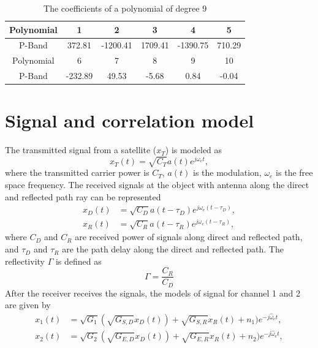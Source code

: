 \documentclass[draftcls]{IEEEtran}
\begin{document}
\begin{table}[ht]
\centering
\begin{tabular}  {|c|c|c|c|c|c|}
	\hline
     Polynomial &1&2 &3&4&5\\
    \hline
   P-Band & 372.81 & -1200.41 &	1709.41 & -1390.75 & 710.29\\
     \hline
     Polynomial &6&7&8&9 &10\\
    \hline
   P-Band & -232.89 &	49.53 &	-5.68 & 0.84 & -0.04 \\
    \hline
\end{tabular}
\caption{The coefficients of a polynomial of degree 9}
\label{Table:Polynomial_fitting}
\end{table}

\section{Signal and correlation model}
The transmitted signal from a satellite ($x_{T}$) is modeled as
\begin{equation}
	x_T(t)=\sqrt{C_T}a(t)e^{j\omega_et},
    \label{Eq: xT}
\end{equation}
where the transmitted carrier power is $C_{T}$, $a(t)$ is the modulation, $ω_{e}$ is the free space frequency. The received signals at the object with antenna along the direct and reflected path ray can be represented \begin{equation}
	\begin{split}
  	x_D(t)&=\sqrt{C_D}a(t-\tau_D)e^{j\omega_e(t-\tau_D)}, \\
    x_R(t)&=\sqrt{C_R}a(t-\tau_R)e^{j\omega_e(t-\tau_R)}, 
    \end{split}
    \label{Eq: xD_xR}
\end{equation}
where $C_D$ and $C_R$ are received power of signals along direct and reflected path, and $\tau_D$ and $\tau_R$ are the path delay along the direct and reflected path. The reflectivity $\Gamma$ is defined as
\begin{equation}
	\Gamma=\frac{C_R}{C_D}
    \label{Eq: reflect}
\end{equation}
 After the receiver receives the signals, the models of signal for channel 1 and 2 are given by
 \begin{equation}
  \begin{split}
  	x_1(t)&=\sqrt{G_1}(\sqrt{G_{S,D}} x_D(t)) + \sqrt{G_{S,R}} x_R(t) + n_1)e^{-j\hat{\omega}_et},\\
    x_2(t)&=\sqrt{G_2}(\sqrt{G_{E,D}} x_D(t)) + \sqrt{G_{E,R}} x_R(t) + n_2)e^{-j\hat{\omega}_et},
  \end{split}
  \label{Eq: x1_x2_model}
\end{equation}
\end{document}
